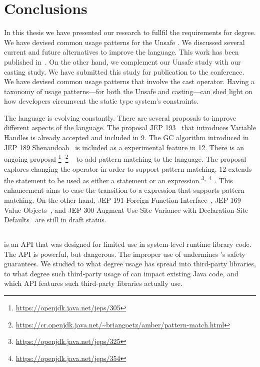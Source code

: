 \chapter{Conclusions}\label{cha:conclusions}

In this thesis we have presented our research to fullfil the requirements for \phd{} degree.
We have devised common usage patterns for the \java{} Unsafe \api{}.
We discussed several current and future alternatives to improve the
\java{} language.
This work has been published in~\citep{mastrangeloUseYourOwn2015}.
On the other hand, we complement our Unsafe \api{} study with 
our casting study.
We have submitted this study for publication to the  conference.
We have devised common usage patterns that involve the cast operator.
Having a taxonomy of usage patterns---for both the Unsafe \api{} and casting---can shed light on how \java{} developers circumvent the static type system's constraints.

The \java{} language is evolving constantly.
There are several proposals to improve different aspects of the language.
The proposal JEP 193~\citep{jep193} that introduces Variable Handles is already accepted and included in \java{} 9.
The GC algorithm introduced in JEP 189 Shenandoah~\citep{jep189} is included as a experimental feature in \java{} 12.
There is an ongoing proposal%
\footnote{\url{https://openjdk.java.net/jeps/305}}$^{,}$%
\footnote{\url{https://cr.openjdk.java.net/~briangoetz/amber/pattern-match.html}}%
~\citep{jep305} to add pattern matching to the \java{} language.
The proposal explores changing the  operator in order to support pattern matching.
\java{} 12 extends the  statement to be used as either a statement or an expression%
\footnote{\url{https://openjdk.java.net/jeps/325}}$^{,}$%
\footnote{\url{https://openjdk.java.net/jeps/354}}~\citep{jep325,jep354}.
This enhancement aims to ease the transition to a  expression that supports pattern matching.
On the other hand,
JEP 191 Foreign Function Interface~\citep{jep191},
JEP 169 Value Objects~\citep{jep169}, and
JEP 300 Augment Use-Site Variance with Declaration-Site Defaults~\citep{jep300}
are still in draft status.

\section*{}

\smu{} is an API that was designed for limited use in system-level runtime library code.
The \unsafe{} API is powerful, but dangerous.
The improper use of \unsafe{} undermines \java{}'s safety guarantees.
We studied to what degree \unsafe{} usage has spread into third-party libraries,
to what degree such third-party usage of \unsafe{} can impact existing Java code,
and which \unsafe{} API features such third-party libraries actually use.

